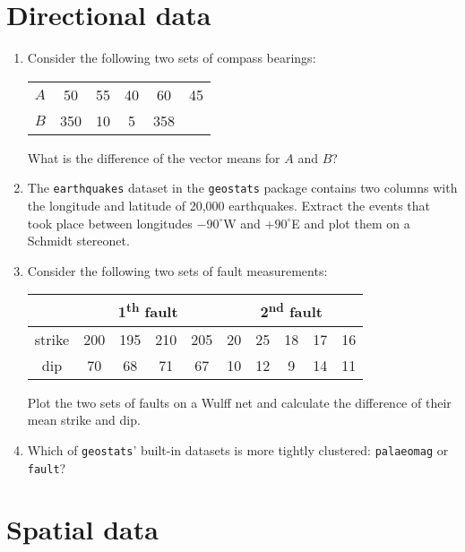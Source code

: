 \section{Directional data}
\label{sec:ex-directional}

\begin{enumerate}

\item Consider the following two sets of compass bearings:

  \begin{tabular}{c|ccccc}
    $A$ & 50 & 55 & 40 & 60 & 45 \\
    $B$ & 350 & 10 & 5 & 358 & 
  \end{tabular}

  What is the difference of the vector means for $A$ and $B$?

\item The \texttt{earthquakes} dataset in the \texttt{geostats}
  package contains two columns with the longitude and latitude of
  20,000 earthquakes.  Extract the events that took place between
  longitudes $-90^\circ$W and +$90^\circ$E and plot them on a Schmidt
  stereonet.

\item Consider the following two sets of fault measurements:

  \begin{tabular}{c|cccc|ccccc}
    ~ & \multicolumn{4}{c|}{1\textsuperscript{th} fault} &
        \multicolumn{5}{c}{2\textsuperscript{nd} fault} \\ \hline
    strike & 200 & 195 & 210 & 205 & 20 & 25 & 18 & 17 & 16 \\
    dip    & 70  & 68  & 71  & 67 & 10 & 12 & 9  & 14 & 11 \\
  \end{tabular}

  Plot the two sets of faults on a Wulff net and calculate the
  difference of their mean strike and dip.

\item Which of \texttt{geostats}' built-in datasets is more tightly
  clustered: \texttt{palaeomag} or \texttt{fault}?
  
\end{enumerate}

\section{Spatial data}
\label{sec:ex-spatial}

